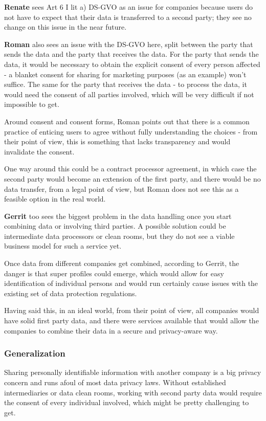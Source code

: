 \textbf{Renate} sees Art 6 I lit a) DS-GVO as an issue for companies because users do not have to expect that their data is transferred to a second party; they see no change on this issue in the near future.

\textbf{Roman} also sees an issue with the DS-GVO here, split between the party that sends the data and the party that receives the data. For the party that sends the data, it would be necessary to obtain the explicit consent of every person affected - a blanket consent for sharing for marketing purposes (as an example) won't suffice. The same for the party that receives the data - to process the data, it would need the consent of all parties involved, which will be very difficult if not impossible to get.

Around consent and consent forms, Roman points out that there is a common practice of enticing users to agree without fully understanding the choices - from their point of view, this is something that lacks transparency and would invalidate the consent.

One way around this could be a contract processor agreement, in which case the second party would become an extension of the first party, and there would be no data transfer, from a legal point of view, but Roman does not see this as a feasible option in the real world.

\textbf{Gerrit} too sees the biggest problem in the data handling once you start combining data or involving third parties. A possible solution could be intermediate data processors or clean rooms, but they do not see a viable business model for such a service yet.

Once data from different companies get combined, according to Gerrit, the danger is that super profiles could emerge, which would allow for easy identification of individual persons and would run certainly cause issues with the existing set of data protection regulations.

Having said this, in an ideal world, from their point of view, all companies would have solid first party data, and there were services available that would allow the companies to combine their data in a secure and privacy-aware way. 

\subsubsection{Generalization}

Sharing personally identifiable information with another company is a big privacy concern and runs afoul of most data privacy laws. Without established intermediaries or data clean rooms, working with second party data would require the consent of every individual involved, which might be pretty challenging to get.

